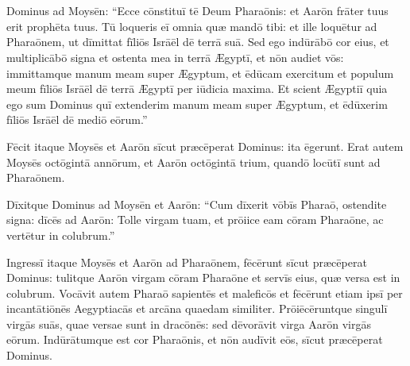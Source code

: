 \chapter{}


\thispagestyle{empty}

 Dominus ad Moysēn: ``Ecce cōnstituī tē Deum
Pharaōnis: et Aarōn frāter tuus erit
prophēta tuus. Tū loqueris eī omnia quæ
mandō tibi: et ille loquētur ad Pharaōnem,
ut dīmittat fīliōs Isrāēl dē terrā suā. Sed ego
indūrābō cor eius, et
multiplicābō signa et ostenta mea
in terrā Ægyptī, et nōn audiet vōs: immittamque manum meam super Ægyptum, et ēdūcam exercitum et
populum meum fīliōs Isrāēl dē terrā Ægyptī per
iūdicia maxima. Et scient Ægyptiī quia ego sum Dominus
quī extenderim manum meam super Ægyptum, et ēdūxerim fīliōs
Isrāēl dē mediō eōrum.''

Fēcit itaque
Moysēs et Aarōn sīcut præcēperat
Dominus: ita ēgerunt. Erat autem Moysēs octōgintā
annōrum, et Aarōn octōgintā trium, quandō locūtī sunt ad
Pharaōnem.

Dīxitque Dominus ad Moysēn et
Aarōn: ``Cum dīxerit vōbīs Pharaō, ostendite signa: dīcēs
ad Aarōn: Tolle virgam tuam, et prōiice eam cōram
Pharaōne, ac vertētur in colubrum.''

Ingressī itaque Moysēs et Aarōn ad Pharaōnem, fēcērunt sīcut
præcēperat Dominus: tulitque Aarōn virgam cōram
Pharaōne et servīs eius, quæ versa est in
colubrum. Vocāvit autem Pharaō sapientēs
et maleficōs et fēcērunt etiam ipsī per
incantātiōnēs Aegyptiacās et
arcāna quaedam similiter. Prōiēcēruntque
singulī virgās suās, quae versae sunt in dracōnēs: sed
dēvorāvit virga Aarōn virgās eōrum.  Indūrātumque est cor Pharaōnis, et nōn audīvit eōs,
sīcut præcēperat Dominus.

